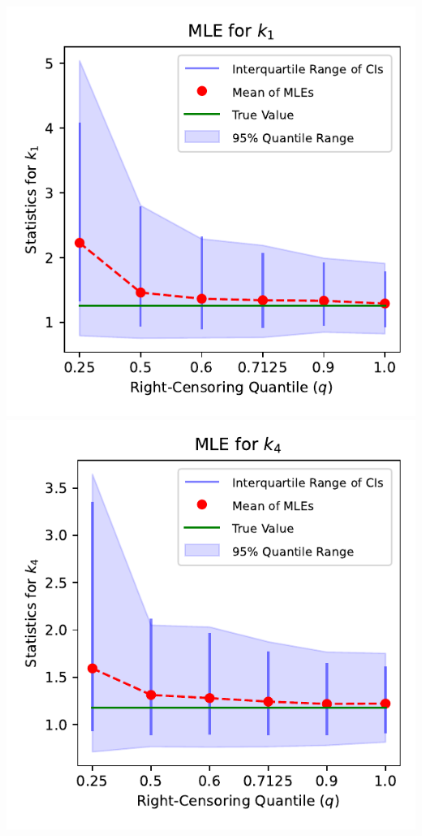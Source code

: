 \documentclass{article}
\begin{document}
\pagestyle{empty}

\noindent
\begin{minipage}[t]{0.5\textwidth}
  \centering
  \includegraphics[width=\textwidth,height=0.33\textheight,keepaspectratio]{plot-q-vs-shape.1.pdf}\\
  \vspace{0.5mm}
  \includegraphics[width=\textwidth,height=0.33\textheight,keepaspectratio]{plot-q-vs-shape.4.pdf}\\

\end{minipage}
\end{document}
